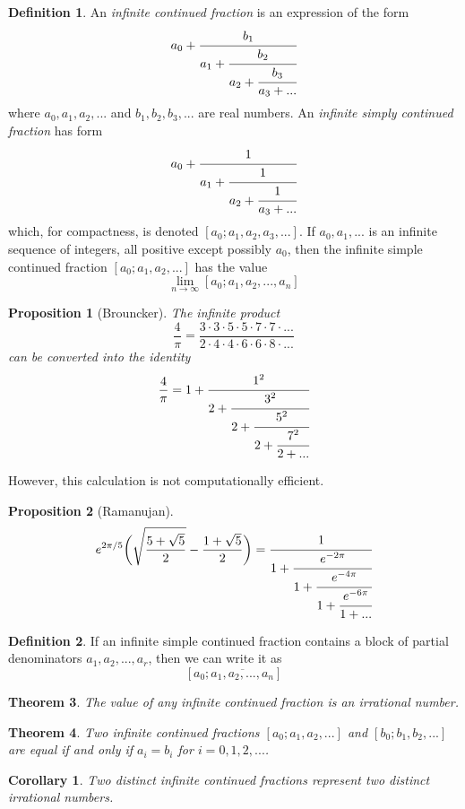 \documentclass{article}
\newtheorem{theorem}{Theorem}[section]
\newtheorem{proposition}[theorem]{Proposition}
\newtheorem{corollary}{Corollary}[theorem]
\theoremstyle{remark}
\theoremstyle{definition}
\newtheorem{definition}{Definition}[section]
\begin{document}
\begin{definition}
An \textit{infinite continued fraction} is an expression of the form 
\[a_0 + \cfrac{b_1}{a_1 + \cfrac{b_2}{a_2 + \cfrac{b_3}{a_3 + ...}}}\]
where $a_0, a_1, a_2, ...$ and $b_1, b_2, b_3, ...$ are real numbers. An \textit{infinite simply continued fraction} has form 
\[a_0 + \cfrac{1}{a_1 + \cfrac{1}{a_2 + \cfrac{1}{a_3 + ...}}}\]
which, for compactness, is denoted $[a_0;a_1, a_2, a_3, ...]$. If $a_0, a_1, ...$ is an infinite sequence of integers, all positive except possibly $a_0$, then the infinite simple continued fraction $[a_0; a_1, a_2, ...]$ has the value 
\[\lim_{n \rightarrow \infty} [a_0 ; a_1, a_2, ..., a_n]\]
\end{definition}

\begin{proposition}[Brouncker]
The infinite product 
\[\frac{4}{\pi} = \frac{3 \cdot 3 \cdot 5 \cdot 5 \cdot 7 \cdot 7 \cdot ...}{2 \cdot 4 \cdot 4 \cdot 6 \cdot 6 \cdot 8 \cdot ...}\]
can be converted into the identity
\[\frac{4}{\pi} = 1 + \cfrac{1^2}{2 + \cfrac{3^2}{2 + \cfrac{5^2} {2+\cfrac{7^2}{2+...}}}}\]
\end{proposition}
However, this calculation is not computationally efficient. 

\begin{proposition}[Ramanujan]
\[e^{2\pi/5} \bigg( \sqrt{\frac{5+\sqrt{5}}{2}} - \frac{1+\sqrt{5}}{2} \bigg) = \cfrac{1}{1 + \cfrac{e^{-2\pi}}{1+\cfrac{e^{-4\pi}}{1+\cfrac{e^{-6\pi}}{1+...}}}}\]
\end{proposition}

\begin{definition}
If an infinite simple continued fraction contains a block of partial denominators $a_1, a_2, ..., a_r$, then we can write it as
\[[a_0; \overline{a_1, a_2, ..., a_n}]\]
\end{definition}

\begin{theorem}
The value of any infinite continued fraction is an irrational number. 
\end{theorem}

\begin{theorem}
Two infinite continued fractions $[a_0; a_1, a_2, ...]$ and $[b_0; b_1, b_2, ...]$ are equal if and only if $a_i = b_i$ for $i = 0, 1, 2, ...$. 
\end{theorem}

\begin{corollary}
Two distinct infinite continued fractions represent two distinct irrational numbers. 
\end{corollary}
\end{document}
